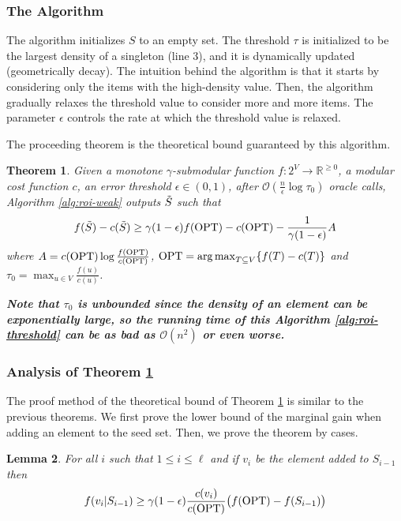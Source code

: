 \documentclass[10pt]{article} %
\DeclareMathOperator*{\argmax}{arg\,max}
\newtheorem{theorem}{Theorem}
\newtheorem{lemma}[theorem]{Lemma}
\theoremstyle{remark}
\newcommand{\OPT}{{\rm OPT}}
\begin{document}
\subsubsection{The Algorithm}
The algorithm initializes $S$ to an empty set. The threshold $\tau$ is initialized to be the largest density of a singleton (line 3), and it is dynamically updated (geometrically decay). The intuition behind the algorithm is that it starts by considering only the items with the high-density value. Then, the algorithm gradually relaxes the threshold value to consider more and more items. The parameter $\epsilon$ controls the rate at which the threshold value is relaxed.

The proceeding theorem is the theoretical bound guaranteed by this algorithm. 


\begin{theorem}
\label{th:unconstrained-thresh}
    Given a monotone $\gamma$-submodular function $f:2^{V} \rightarrow \mathbb{R}^{\geq 0}$, a modular cost function $c$, an error threshold $\epsilon \in (0,1)$, after $\mathcal{O}(\frac{n}{\epsilon}\log \tau_0)$ oracle calls,  Algorithm \ref{alg:roi-weak} outputs $\Tilde{S}$ such that
    \[f(\Tilde{S})-c(\Tilde{S}) \geq \gamma(1-\epsilon) f(\OPT)-c(\OPT)- \frac{1}{\gamma(1-\epsilon)}A\]
    where $A = c(\OPT) \log \frac{f(\OPT)}{c(\OPT)}$, $\OPT =  \argmax_{T \subseteq V}\{f(T)-c(T)\}$ and $\tau_0 = \max_{u \in V}\frac{f(u)}{c(u)}$.
\end{theorem}

\textbf{\textit{Note that $\tau_0$ is unbounded since the density of an element can be exponentially large, so the running time of this Algorithm \ref{alg:roi-threshold} can be as bad as $\mathcal{O}(n^2)$ or even worse.}}



\subsubsection{Analysis of Theorem \ref{th:unconstrained-thresh}}
The proof method of the theoretical bound of Theorem \ref{th:unconstrained-thresh} is similar to the previous theorems. We first prove the lower bound of the marginal gain when adding an element to the seed set. Then, we prove the theorem by cases.

\begin{lemma}
\label{lem:marginal-gain-t}
For all $i$ such that $1 \leq i \leq \ell$ and if $v_i$ be the element added to $S_{i-1}$ then
\[ 
f(v_i|S_{i-1}) \geq \gamma(1-\epsilon) \frac{c(v_i)}{c(\OPT)} \big ( f(\OPT) - f(S_{i-1}) \big ) 
\]
\end{lemma}
\end{document}
